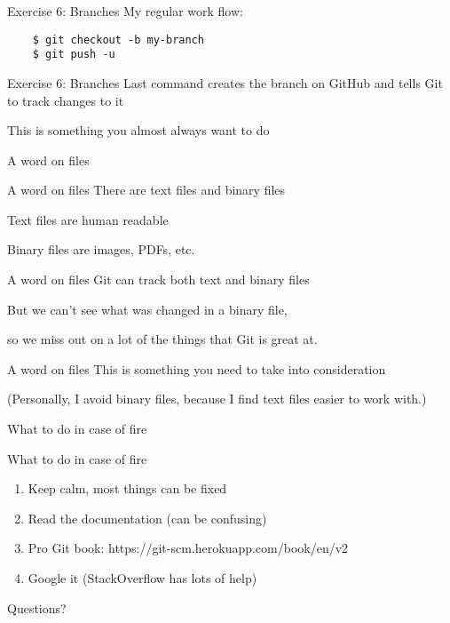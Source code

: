 \documentclass{beamer}
\begin{document}
\begin{frame}[fragile]{Exercise 6: Branches}
  My regular work flow:

  \begin{verbatim}
    $ git checkout -b my-branch
    $ git push -u
  \end{verbatim}
\end{frame}

\begin{frame}{Exercise 6: Branches}
  \center
  \Large
  Last command creates the branch on GitHub and tells Git to track changes to it
  \pause

  This is something you almost always want to do

\end{frame}

\begin{frame}{}
  \center
  \Huge A word on files
\end{frame}

\begin{frame}{A word on files}
  \center
  \huge There are text files and binary files
  \pause

  \Large Text files are human readable
  \pause

  \Large Binary files are images, PDFs, etc.
\end{frame}

\begin{frame}{A word on files}
  \center
  \Huge Git can track both text and binary files
  \pause

  \Large But we can't see what was changed in a binary file,

  \Large so we miss out on a lot of the things that Git is great at.
\end{frame}

\begin{frame}{A word on files}
  \center
  \Huge This is something you need to take into consideration
  \pause

  \Large (Personally, I avoid binary files, because I find text files
  easier to work with.)
\end{frame}

\begin{frame}{}
  \center
  \Huge What to do in case of fire
\end{frame}

\begin{frame}{What to do in case of fire}
  \begin{enumerate}
    \item Keep calm, most things can be fixed
    \item Read the documentation (can be confusing)
    \item Pro Git book: https://git-scm.herokuapp.com/book/en/v2
    \item Google it (StackOverflow has lots of help)
  \end{enumerate}
\end{frame}

\begin{frame}{}
  \center
  \Huge Questions?
\end{frame}
\end{document}
